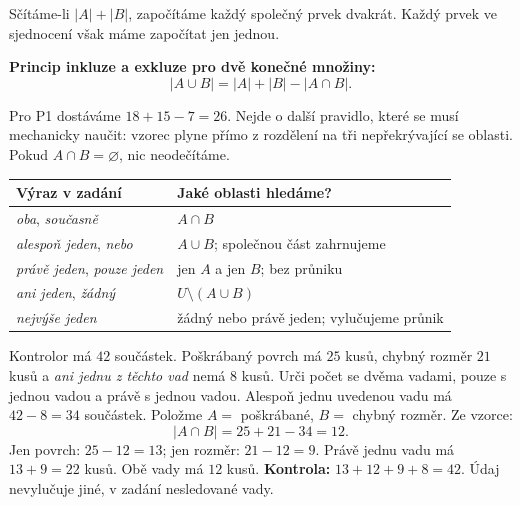 \documentclass[11pt,a4paper]{article}
\begin{document}

Sčítáme-li $|A|+|B|$, započítáme každý společný prvek dvakrát.
Každý prvek ve sjednocení však máme započítat jen jednou.

\begin{definiceBox}[title={Věta - Princip inkluze a exkluze pro dvě množiny}]
\textbf{Princip inkluze a exkluze pro dvě konečné množiny:}
\[
\boxed{|A\cup B|=|A|+|B|-|A\cap B|.}
\]
\end{definiceBox}

Pro P1 dostáváme $18+15-7=26$. Nejde o další pravidlo, které se musí
mechanicky naučit: vzorec plyne přímo z rozdělení na tři nepřekrývající
se oblasti. Pokud $A\cap B=\varnothing$, nic neodečítáme.

\begin{center}
\begin{tabularx}{\linewidth}{@{}lX@{}}
\toprule
Výraz v zadání & Jaké oblasti hledáme?\\ \midrule
\emph{oba}, \emph{současně} & $A\cap B$\\
\emph{alespoň jeden}, \emph{nebo} & $A\cup B$; společnou část zahrnujeme\\
\emph{právě jeden}, \emph{pouze jeden} & jen $A$ a jen $B$; bez průniku\\
\emph{ani jeden}, \emph{žádný} & $U\setminus(A\cup B)$\\
\emph{nejvýše jeden} & žádný nebo právě jeden; vylučujeme průnik\\
\bottomrule
\end{tabularx}
\end{center}

\begin{prikladReseniBox}[title={Příklad 2}]
Kontrolor má $42$ součástek. Poškrábaný povrch má $25$ kusů,
chybný rozměr $21$ kusů a \emph{ani jednu z těchto vad} nemá $8$ kusů.
Urči počet se dvěma vadami, pouze s jednou vadou a právě s jednou vadou.
\tcblower
Alespoň jednu uvedenou vadu má $42-8=34$ součástek.
Položme $A=$ poškrábané, $B=$ chybný rozměr. Ze vzorce:
\[
|A\cap B|=25+21-34=12.
\]
Jen povrch: $25-12=13$; jen rozměr: $21-12=9$.
Právě jednu vadu má $13+9=22$ kusů. Obě vady má $12$ kusů.
\textbf{Kontrola:} $13+12+9+8=42$.
Údaj  nevylučuje jiné, v zadání nesledované vady.
\end{prikladReseniBox}
\end{document}
